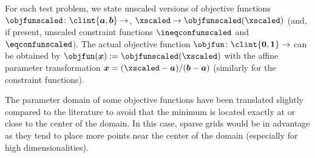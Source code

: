 For each test problem, we state unscaled versions of objective functions
$\objfunscaled\colon \clint{\*a, \*b} \to \real$,
$\xscaled \to \objfunscaled(\xscaled)$
(and, if present, unscaled constraint functions
$\ineqconfunscaled$ and $\eqconfunscaled$).
The actual objective function $\objfun\colon \clint{\*0, \*1} \to \real$
can be obtained by $\objfun(\*x) := \objfunscaled(\xscaled)$
with the affine parameter transformation
$\*x = (\xscaled - \*a)/(\*b - \*a)$
(similarly for the constraint functions).

The parameter domain of some objective functions have been translated slightly
compared to the literature
to avoid that the minimum is located exactly at or close to
the center of the domain.
In this case, sparse grids would be in advantage as
they tend to place more points near the center of the domain
(especially for high dimensionalities).


